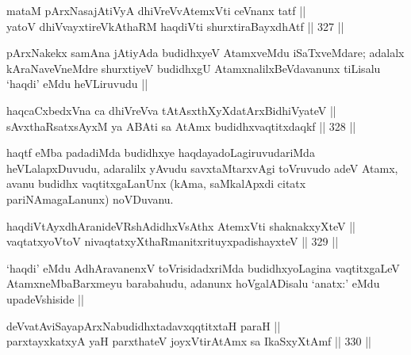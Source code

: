 
\begin{shl}
mataM pArxNasajAtiVyA dhiVreVvA\s \s temxVti ceVnanx tatf || \\
yatoV dhiVvayxtireVkAthaRM haqdiVti shurxtiraBayxdhAtf ||  327 || 
\end{shl}

\begin{artha}
pArxNakekx samAna jAtiyAda budidhxyeV AtamxveMdu iSaTxveMdare; adalalx kAraNaveVneMdre shurxtiyeV budidhxgU AtamxnalilxBeVdavanunx tiLisalu `haqdi' eMdu heVLiruvudu ||
\end{artha}


\begin{shl}
haqcaCxbedxVna ca dhiVreVva tAtAsxthXyXdatArxBidhiVyateV || \\
sAvxthaRsatxsAyxM ya ABAti sa AtAmx budidhxvaqtitxdaqkf ||  328 ||  
\end{shl}

\begin{artha}
haqtf eMba padadiMda budidhxye haqdayadoLagiruvudariMda heVLalapxDuvudu, adaralilx yAvudu savxtaMtarxvAgi toVruvudo adeV Atamx, avanu budidhx vaqtitxgaLanUnx (kAma, saMkalApxdi citatx pariNAmagaLanunx) noVDuvanu.
\end{artha}


\begin{shl}
haqdiVtAyxdhAranideVRshAdidhxVsAthx AtemxVti shaknakxyXteV || \\
vaqtatxyoV\s toV nivaqtatxyXthaRmanitxrituyxpadishayxteV ||  329 || 
\end{shl}

\begin{artha}
`haqdi' eMdu AdhAravanenxV toVrisidadxriMda budidhxyoLagina vaqtitxgaLeV AtamxneMbaBarxmeyu barabahudu, adanunx hoVgalADisalu `anatx:' eMdu upadeVshiside ||
\end{artha}


\begin{shl}
deVvatAviSayapArxNabudidhxtadavxqqtitxtaH paraH || \\
parxtayxkatxyA yaH parxthateV joyxVtirAtAmx sa IkaSxyXtAmf ||  330 ||  
\end{shl}

